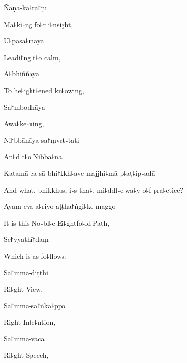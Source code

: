 Ñāṇa-ka꜕ra꜓ṇī

\begin{english}
  Ma꜕ki꜕ng fo꜕r i꜕nsight,
\end{english}

U꜕pasa꜕māya

\begin{english}
  Leadi꜓ng t꜕o calm,
\end{english}

A꜕bhiññāya

\begin{english}
  To he꜕ight꜕ened kn꜕owing,
\end{english}

Sa꜓mbodhāya

\begin{english}
  Awa꜕ke꜕ning,
\end{english}

Ni꜓bbānāya sa꜓ṃvat꜕tati

\begin{english}
  An꜕d t꜕o Nibbā꜕na.
\end{english}

Katamā ca sā bhi꜓kkh꜕ave majjhi꜕mā p꜕aṭ꜕ip꜕adā

\begin{english}
  And what, bhikkhus, i꜕s tha꜕t mi꜕ddl꜕e wa꜕y o꜕f pra꜕ctice?
\end{english}

Ayam-eva a꜕riyo aṭṭha꜓ṅgi꜕ko maggo

\begin{english}
  It is this No꜕bl꜕e Ei꜕ghtfo꜕ld Path,
\end{english}

Se꜓yyathī꜓daṃ

\begin{english}
  Which is as fo꜕llows:
\end{english}

Sa꜓mmā-diṭṭhi

\begin{english}
  Ri꜕ght View,
\end{english}

Sa꜓mmā-sa꜓ṅka꜕ppo

\begin{english}
  Right Inte꜕ntion,
\end{english}

Sa꜓mmā-vācā

\begin{english}
  Ri꜕ght Speech,
\end{english}

